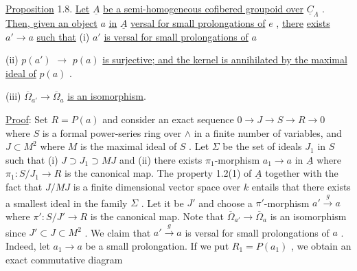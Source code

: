 \underline{Proposition} 1.8.   \underline{Let}  $\underline{A}$  \underline{be a semi-homogeneous cofibered groupoid over}  $\underline{C}_{\Lambda}$  . \underline{Then, given an object}  $a$  \underline{in}  $\underline{A}$  \underline{versal for small prolongations of}  $e$  , \underline{there} \underline{exists}  $a' \rightarrow a$  \underline{such that}
(i)  $a'$  \underline{is versal for small prolongations of}  $a$

(ii)  $p(a')$ $\longrightarrow$ $p(a)$  \underline{is surjective; and the kernel is annihilated by the maximal ideal of}  $p(a)$  .

(iii)  $\overline{\Omega}_{a'} \longrightarrow \overline{\Omega}_{a}$  \underline{is an isomorphism}.

\underline{Proof}:  Set  $R = P(a)$  and consider an exact sequence  $0 \to J \to S \to R \to 0$  where $S$  is a formal power-series ring over  $\wedge$  in a finite number of variables, and $J \subset M^2$  where  $M$  is the maximal ideal of  $S$  . Let  $\Sigma$  be the set of ideals  $J_1$ in  $S$  such that (i)  $J \supset J_1 \supset MJ$  and (ii) there exists  $\pi_1$-morphism  $a_1 \to a$  in  $\underline{A}$  where  $\pi_1 : S/J_1 \to R$  is the canonical map. The property 1.2(1) of  $\underline{A}$  together with the fact that  $J/MJ$  is a finite dimensional vector space over  $k$  entails that there exists a smallest ideal in the family  $\Sigma$  . Let it be  $J'$  and choose a  $\pi'$-morphism  $a' \overset{g}{\to} a$  where  $\pi' : S/J' \to R$  is the canonical map. Note that $\overline{\Omega}_{a'} \to \overline{\Omega}_{a}$  is an isomorphism since  $J' \subset J \subset M^2$  . We claim that  $a' \overset{g}{\to} a$  is versal for small prolongations of  $a$  . Indeed, let  $a_1 \to a$  be a small prolongation. If we put  $R_1 = P(a_1)$  , we obtain an exact commutative diagram


